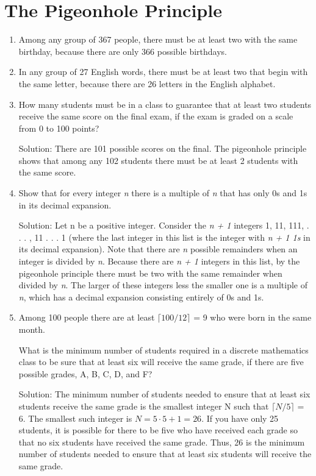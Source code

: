 \documentclass[11pt,a4paper]{book}
\begin{document}
\section{The Pigeonhole Principle}
\begin{enumerate}[label=Example~\arabic*]
\item Among any group of 367 people, there must be at least two with the same birthday, because there are only 366 possible birthdays.
\item In any group of 27 English words, there must be at least two that begin with the same letter, because there are 26 letters in the English alphabet.
\item How many students must be in a class to guarantee that at least two students receive the same score on the final exam, if the exam is graded on a scale from 0 to 100 points?

Solution: There are 101 possible scores on the final.
The pigeonhole principle shows that among any 102 students there must be at least 2 students with the same score.

\item Show that for every integer \emph{n} there is a multiple of \emph{n} that has only 0s and 1s in its decimal expansion.

Solution: Let n be a positive integer.
Consider the \emph{n + 1} integers 1, 11, 111, . . . , 11 . . . 1 (where the last integer in this list is the integer with \emph{n + 1 1s} in its decimal expansion).
Note that there are \emph{n} possible remainders when an integer is divided by \emph{n}.
Because there are \emph{n + 1} integers in this list, by the pigeonhole principle there must be two with the same remainder when divided by \emph{n}.
The larger of these integers less the smaller one is a multiple of \emph{n}, which has a decimal expansion consisting entirely of 0s and 1s.

\item Among 100 people there are at least $\lceil 100/12 \rceil$ = 9 who were born in the same month.

What is the minimum number of students required in a discrete mathematics class to be sure that at least six will receive the same grade, if there are five possible grades, A, B, C, D, and F?

Solution: The minimum number of students needed to ensure that at least six students receive the same grade is the smallest integer N such that $\lceil N/5 \rceil$ = 6.
The smallest such integer is $N = 5 \cdot 5 + 1 = 26$.
If you have only 25 students, it is possible for there to be five who have received each grade so that no six students have received the same grade.
Thus, 26 is the minimum number of students needed to ensure that at least six students will receive the same grade.


\end{enumerate}
\end{document}
